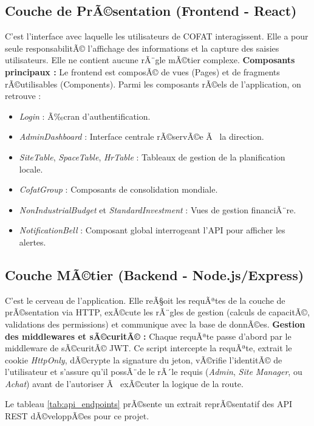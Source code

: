 \subsection{Couche de PrÃ©sentation (Frontend - React)}
C'est l'interface avec laquelle les utilisateurs de COFAT interagissent. Elle a pour seule responsabilitÃ© l'affichage des informations et la capture des saisies utilisateurs. Elle ne contient aucune rÃ¨gle mÃ©tier complexe.
\newline
\textbf{Composants principaux :} Le frontend est composÃ© de vues (Pages) et de fragments rÃ©utilisables (Components). Parmi les composants rÃ©els de l'application, on retrouve :
\begin{itemize}
    \item \textit{Login} : Ã‰cran d'authentification.
    \item \textit{AdminDashboard} : Interface centrale rÃ©servÃ©e Ã  la direction.
    \item \textit{SiteTable}, \textit{SpaceTable}, \textit{HrTable} : Tableaux de gestion de la planification locale.
    \item \textit{CofatGroup} : Composants de consolidation mondiale.
    \item \textit{NonIndustrialBudget} et \textit{StandardInvestment} : Vues de gestion financiÃ¨re.
    \item \textit{NotificationBell} : Composant global interrogeant l'API pour afficher les alertes.
\end{itemize}

\subsection{Couche MÃ©tier (Backend - Node.js/Express)}
C'est le cerveau de l'application. Elle reÃ§oit les requÃªtes de la couche de prÃ©sentation via HTTP, exÃ©cute les rÃ¨gles de gestion (calculs de capacitÃ©, validations des permissions) et communique avec la base de donnÃ©es.
\newline
\textbf{Gestion des middlewares et sÃ©curitÃ© :} Chaque requÃªte passe d'abord par le middleware de sÃ©curitÃ© JWT. Ce script intercepte la requÃªte, extrait le cookie \textit{HttpOnly}, dÃ©crypte la signature du jeton, vÃ©rifie l'identitÃ© de l'utilisateur et s'assure qu'il possÃ¨de le rÃ´le requis (\textit{Admin}, \textit{Site Manager}, ou \textit{Achat}) avant de l'autoriser Ã  exÃ©cuter la logique de la route.

Le tableau \ref{tab:api_endpoints} prÃ©sente un extrait reprÃ©sentatif des API REST dÃ©veloppÃ©es pour ce projet.

